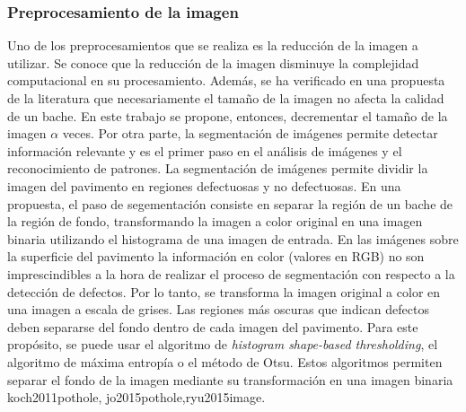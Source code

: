 		\subsubsection{Preprocesamiento de la imagen}
		Uno de los preprocesamientos que se realiza es la reducción de la imagen a utilizar. Se conoce que la reducción de la imagen  disminuye 
		la complejidad computacional en su procesamiento. Además, se ha verificado en una propuesta de la literatura 
		que necesariamente el tamaño de la imagen no afecta la calidad de un bache.  En este trabajo se propone, entonces, 
		decrementar el tamaño de la imagen $\alpha$ veces.
		Por otra parte, la segmentación de imágenes permite detectar información relevante y es el primer paso en el análisis de imágenes y el 
		reconocimiento de patrones.
		La segmentación de imágenes permite  dividir la imagen del pavimento en regiones defectuosas y no defectuosas.
		En una propuesta, el paso de segementación consiste en separar la región de un bache de la región de fondo, transformando la imagen a color original 
		en una imagen binaria utilizando el histograma de una imagen de entrada.
		En las imágenes sobre la superficie del pavimento la información en color (valores en RGB) no son imprescindibles a la hora de realizar 
		el proceso de segmentación con respecto a la detección de defectos. Por lo tanto, se  transforma la imagen original a color en una 
		imagen a escala de grises. Las regiones más oscuras que indican defectos deben separarse del fondo 
		dentro de cada imagen del pavimento. Para este propósito, se puede usar el algoritmo de \emph{histogram shape-based
		thresholding}, el algoritmo de máxima entropía o el método de Otsu.
		Estos algoritmos permiten separar el fondo de la imagen mediante su transformación en una imagen binaria\brackcite
		{koch2011pothole, jo2015pothole,ryu2015image}. 

